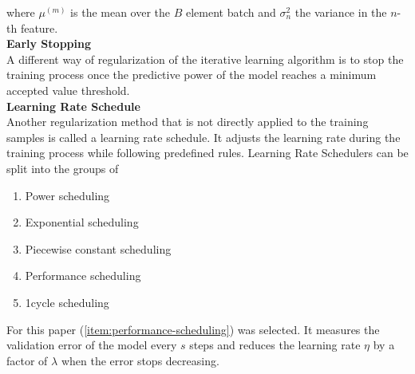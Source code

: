 where $\mu^{(m)}$ is the mean over the $B$ element batch and $\sigma_n^2$ the variance in the $n$-th feature.
\\
\textbf{Early Stopping}\\
A different way of regularization of the iterative learning algorithm is to stop the training process once the predictive power of the model reaches a minimum accepted value threshold.\\
\textbf{Learning Rate Schedule}\\
Another regularization method that is not directly applied to the training samples is called a learning rate schedule.
It adjusts the learning rate during the training process while following predefined rules.
Learning Rate Schedulers can be split into the groups of
\begin{multicols}{2}
\begin{enumerate}
    \item Power scheduling
    \item Exponential scheduling
    \item Piecewise constant scheduling
    \item\label{item:performance-scheduling} Performance scheduling
    \item 1cycle scheduling
\end{enumerate}
\end{multicols}
For this paper (\ref{item:performance-scheduling}) was selected.
It measures the validation error of the model every $s$ steps and reduces the learning rate $\eta$ by a factor of $\lambda$ when the error stops decreasing.
